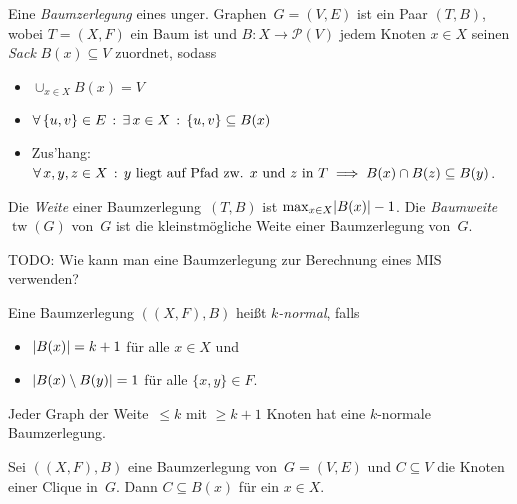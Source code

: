 \documentclass{cheat-sheet}
\newcommand{\size}[1]{\abs{#1}} %
\newcommand{\Powerset}{\mathcal{P}} %
\DeclareMathOperator{\treewidth}{tw} %
\begin{document}
\begin{defn}
  Eine \emph{Baumzerlegung} eines unger. Graphen~$G = (V, E)$ ist ein Paar $(T, B)$, wobei $T = (X, F)$ ein Baum ist und $B : X \to \Powerset(V)$ jedem Knoten $x \in X$ seinen \textit{Sack} $B(x) \subseteq V$ zuordnet, sodass
  \begin{itemize}
    \item $\cup_{x \in X} B(x) = V$
    \item $\forall \, {\{ u, v \} \in E} \,:\, \exists \, {x \in X} \,:\, \{ u, v \} \subseteq B(x)$
    \item Zus'hang: $\forall \, {x, y, z \in X} \,:\, \text{$y$ liegt auf Pfad zw. $x$ und~$z$ in~$T$} \implies B(x) \cap B(z) \subseteq B(y)$.
  \end{itemize}
  Die \emph{Weite} einer Baumzerlegung~$(T, B)$ ist $\max_{x \in X} \size{B(x)} - 1$.
  Die \emph{Baumweite} $\treewidth(G)$ von~$G$ ist die kleinstmögliche Weite einer Baumzerlegung von~$G$.
\end{defn}


TODO: Wie kann man eine Baumzerlegung zur Berechnung eines MIS verwenden?

\begin{defn}
  Eine Baumzerlegung $((X, F), B)$ heißt \emph{$k$-normal}, falls
  \begin{itemize}
    \item $\size{B(x)} = k + 1$ für alle $x \in X$ und
    \item $\size{B(x) \setminus B(y)} = 1$ für alle $\{ x, y \} \in F$.
  \end{itemize}
\end{defn}

\begin{lem}
  Jeder Graph der Weite~$\leq k$ mit $\geq k + 1$ Knoten hat eine $k$-normale Baumzerlegung.
\end{lem}



\begin{lem}
  Sei $((X,F), B)$ eine Baumzerlegung von~$G = (V, E)$ und $C \subseteq V$ die Knoten einer Clique in~$G$.
  Dann $C \subseteq B(x)$ für ein $x \in X$.
\end{lem}
\end{document}
